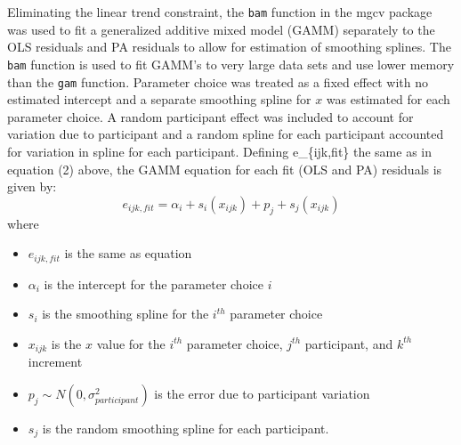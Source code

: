 \documentclass[12pt]{article}
\providecommand{\tightlist}{%
  \setlength{\itemsep}{0pt}\setlength{\parskip}{0pt}}
\begin{document}
Eliminating the linear trend constraint, the \texttt{bam} function in
the mgcv package \citep{mgcv_pkg} was used to fit a generalized additive
mixed model (GAMM) separately to the OLS residuals and PA residuals to
allow for estimation of smoothing splines. The \texttt{bam} function is
used to fit GAMM's to very large data sets and use lower memory than the
\texttt{gam} function. Parameter choice was treated as a fixed effect
with no estimated intercept and a separate smoothing spline for \(x\)
was estimated for each parameter choice. A random participant effect was
included to account for variation due to participant and a random spline
for each participant accounted for variation in spline for each
participant. Defining e\_\{ijk,fit\} the same as in equation (2) above,
the GAMM equation for each fit (OLS and PA) residuals is given by:
\begin{equation}
e_{ijk,fit} = \alpha_i + s_{i}(x_{ijk}) + p_{j} + s_{j}(x_{ijk})
\end{equation} \noindent where

\begin{itemize}
\tightlist
\item
  \(e_{ijk,fit}\) is the same as equation
\item
  \(\alpha_i\) is the intercept for the parameter choice \(i\)
\item
  \(s_{i}\) is the smoothing spline for the \(i^{th}\) parameter choice
\item
  \(x_{ijk}\) is the \(x\) value for the \(i^{th}\) parameter choice,
  \(j^{th}\) participant, and \(k^{th}\) increment
\item
  \(p_{j} \sim N(0, \sigma^2_{participant})\) is the error due to
  participant variation
\item
  \(s_{j}\) is the random smoothing spline for each participant.
\end{itemize}
\end{document}
